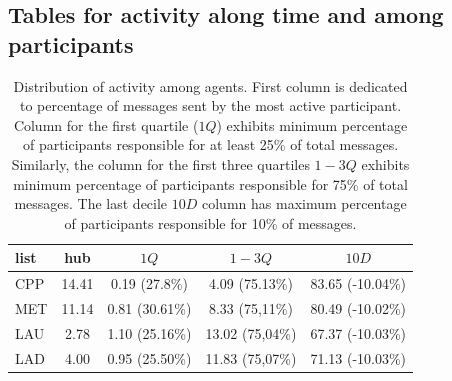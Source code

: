\documentclass[%
 aip,
 jmp,%
 amsmath,amssymb,
 reprint,%
]{revtex4-1}
\begin{document}
\clearpage

\subsection{Tables for activity along time and among participants}\label{tabTime}

\begin{table}
    \caption{Distribution of activity among agents. First column is dedicated to percentage of messages sent by the most active participant. Column for the first quartile ($1Q$) exhibits minimum percentage of participants responsible for at least 25\% of total messages. Similarly, the column for the first three quartiles $1-3Q$ exhibits minimum percentage of participants responsible for 75\% of total messages. The last decile $10D$ column has maximum percentage of participants responsible for 10\% of messages.}
\begin{center}
    \begin{tabular}{ | l ||  c | c | c | c | }
        \hline
        list & hub & $ 1Q $ & $ 1-3Q $ & $10D$ \\ \hline
    CPP & 14.41 & 0.19 (27.8\%) & 4.09 (75.13\%) & 83.65 (-10.04\%)   \\ 
    MET & 11.14 & 0.81 (30.61\%) & 8.33 (75,11\%) & 80.49 (-10.02\%)  \\ 
    LAU & 2.78 & 1.10 (25.16\%) & 13.02 (75,04\%) & 67.37 (-10.03\%) \\ 
    LAD & 4.00 & 0.95 (25.50\%) & 11.83 (75,07\%) & 71.13 (-10.03\%) \\\hline
    \end{tabular}
\end{center}
\label{autores}
\end{table}
\end{document}
